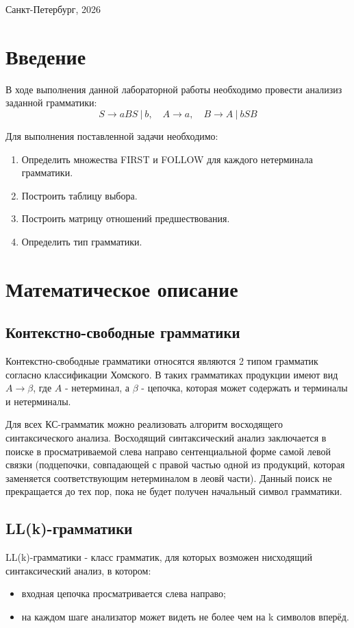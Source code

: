 \documentclass[a4paper,final]{article}
\begin{document}
\hfill \break
\begin{center} \small{Санкт-Петербург, 2026} \end{center}


\newpage
\tableofcontents
\newpage

\section*{Введение}
В ходе выполнения данной лабораторной работы необходимо провести анализиз заданной грамматики:$$ S \rightarrow aBS ~|~ b,\quad A \rightarrow a, \quad B \rightarrow A ~|~ bSB$$

Для выполнения поставленной задачи необходимо:
\begin{enumerate}
    \item Определить множества FIRST и FOLLOW для каждого нетерминала грамматики.
    \item Построить таблицу выбора.
    \item Построить матрицу отношений предшествования.
    \item Определить тип грамматики.
\end{enumerate}

\newpage
\section{Математическое описание}
\subsection{Контекстно-свободные грамматики}
Контекстно-свободные грамматики относятся являются 2 типом грамматик согласно классификации Хомского. В таких грамматиках продукции имеют вид $A \rightarrow \beta$, где $A$ - нетерминал, а $\beta$ - цепочка, которая может содержать и терминалы и нетерминалы.

Для всех КС-грамматик можно реализовать алгоритм восходящего синтаксического анализа. Восходящий синтаксический анализ заключается в поиске в просматриваемой слева направо сентенциальной форме самой левой связки (подцепочки, совпадающей с правой частью одной из продукций, которая заменяется соответствующим нетерминалом в леовй части). Данный поиск не прекращается до тех пор, пока не будет получен начальный символ грамматики.

\subsection{LL(k)-грамматики}
LL(k)-грамматики - класс грамматик, для которых возможен нисходящий синтаксический анализ, в котором:
\begin{itemize}
    \item входная цепочка просматривается слева направо;
    \item на каждом шаге анализатор может видеть не более чем на k символов вперёд.
\end{itemize}
\end{document}
